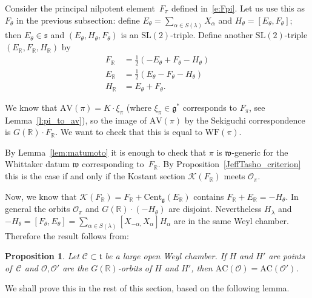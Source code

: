 \documentclass[10pt,leqno]{article}
\newtheorem{proposition}[equation]{Proposition}
\newcommand{\R}{\mathbb R}
\renewcommand{\t}{\mathfrak t}
\newcommand{\g}{\mathfrak g}
\newcommand{\s}{\mathfrak s}
\newcommand{\w}{\mathfrak w}
\newcommand{\AV}{\mathrm{AV}}
\newcommand{\WF}{\mathrm{WF}}
\newcommand{\AC}{\mathrm{AC}}
\newcommand{\Kostant}[1]{\mathcal{K}(#1)}
\begin{document}
Consider the principal nilpotent element~$F_\pi$ defined in~\eqref{e:Fpi}. Let us use this as~$F_\theta$ in the previous subsection: define $E_\theta = \sum_{\alpha \in S(\lambda)}X_\alpha$ and $H_\theta  = [E_\theta, F_\theta]$; then $E_\theta \in \s$ and $(E_\theta, H_\theta, F_\theta)$ is an $\mathrm{SL}(2)$-triple. Define another $\mathrm{SL}(2)$-triple $(E_\R, F_\R, H_\R)$ by
\[ \begin{aligned}
  F_\R&=\frac12(-E_\theta+F_\theta-H_\theta)\\
  E_\R&=\frac12(E_\theta-F_\theta-H_\theta)\\
  H_\R&=E_\theta+F_\theta.
\end{aligned}\]
 
We know that  $\AV(\pi)=K \cdot \xi_\pi$ (where $\xi_\pi\in\g^*$ corresponds to $F_\pi$, see Lemma~\ref{l:pi_to_av}), so the image of $\AV(\pi)$ by the Sekiguchi correspondence is 
 $G(\R)\cdot F_\R$. We want to check that this is equal to $\WF(\pi)$. 

By Lemma~\ref{lem:matumoto} it is enough to check that $\pi$ is $\w$-generic for the Whittaker datum $\w$ corresponding to~$F_\R$. By Proposition~\ref{JeffTasho_criterion} this is the case if and only if the Kostant section $\Kostant{F_\R}$ meets $\mathcal{O}_\pi$. 

Now, we know that $\Kostant{F_\R}=F_\R+\mathrm{Cent}_\g(E_\R)$ contains $F_\R+E_\R = -H_\theta$.
In general the orbits $\mathcal{O}_\pi$ and $G(\R) \cdot (-H_\theta)$ are disjoint. 
Nevertheless $H_{\lambda}$ and $-H_\theta=[F_\theta, E_\theta] = \sum_{\alpha \in S(\lambda)} [X_{-\alpha,} X_\alpha]H_\alpha$ are in the same Weyl chamber. 
Therefore the result follows from:  

\begin{proposition}\label{prop:AC_chamber} Let $\mathcal{C} \subset \t$ be a large open Weyl chamber.
If $H$ and $H'$ are  points of~$\mathcal{C}$ and $\mathcal{O}, \mathcal{O}'$ are the   $G(\R)$-orbits of $H$ and $H'$, then $\AC(\mathcal{O})=\AC(\mathcal{O}')$.
\end{proposition}

We shall prove this in the rest of this section, based on the following lemma.
\end{document}
